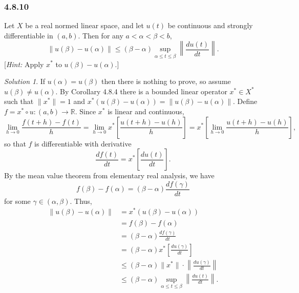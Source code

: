 \documentclass{report}
\newcommand{\bb}[1]{\mathbb{#1}}
\newcommand{\norm}[1]{{\lVert #1 \rVert}}
\newcommand{\snorm}[1]{\left\lVert #1 \right\rVert}
\theoremstyle{remark}
\newtheorem*{solution}{Solution}
\begin{document}
\subsubsection*{4.8.10}
Let $X$ be a real normed linear space, and let $u(t)$ be continuous and strongly differentiable in $(a,b)$. Then for any $a < \alpha < \beta < b$,
\begin{equation*}
  \norm{u(\beta) - u(\alpha)} \le (\beta - \alpha) \sup_{\alpha \le t \le \beta} \snorm{\frac{du(t)}{dt}}.
\end{equation*}
[\emph{Hint:} Apply $x^*$ to $u(\beta) - u(\alpha)$.]

\begin{solution}
  If $u(\alpha) = u(\beta)$ then there is nothing to prove, so assume $u(\beta) \ne u(\alpha)$. By Corollary 4.8.4 there is a bounded linear operator $x^* \in X^*$ such that $\norm{x^*} = 1$ and $x^*(u(\beta) - u(\alpha)) = \norm{u(\beta) - u(\alpha)}$. Define $f = x^* \circ u: (a,b) \to \bb R$. Since $x^*$ is linear and continuous,
  \begin{equation*}
    \lim_{h \to 0} \frac{f(t+h) - f(t)}{h} = \lim_{h \to 0} x^* \left[ \frac{u(t+h) - u(h)}{h} \right] = x^* \left[ \lim_{h \to 0} \frac{u(t+h) - u(h)}{h} \right],
  \end{equation*}
  so that $f$ is differentiable with derivative
  \begin{equation*}
    \frac{df(t)}{dt} = x^* \left[ \frac{du(t)}{dt} \right].
  \end{equation*}
  By the mean value theorem from elementary real analysis, we have
  \begin{equation*}
    f(\beta) - f(\alpha) = (\beta - \alpha) \frac{df(\gamma)}{dt}
  \end{equation*}
  for some $\gamma \in (\alpha, \beta)$. Thus,
  \begin{equation*}
    \begin{split}
      \norm{u(\beta) - u(\alpha)} &= x^*(u(\beta) - u(\alpha)) \\
      &= f(\beta) - f(\alpha) \\
      &= (\beta - \alpha) \frac{df(\gamma)}{dt} \\
      &= (\beta - \alpha) x^* \left[ \frac{du(\gamma)}{dt} \right] \\
      &\le (\beta - \alpha) \norm{x^*} \cdot \snorm{\frac{du(\gamma)}{dt}} \\
      &\le (\beta - \alpha) \sup_{\alpha \le t \le \beta} \snorm{\frac{du(t)}{dt}}.
    \end{split}
  \end{equation*}
\end{solution}
\end{document}
